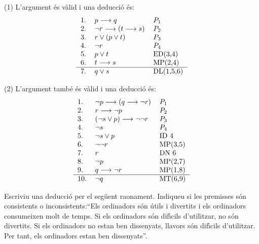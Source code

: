 \begin{solucio}
(1) L'argument \'{e}s v\`{a}lid i una deducci\'{o} \'{e}s:
\[%
\begin{tabular}
[c]{lll}%
1. & $p\longrightarrow q$ & $P_{1}$\\
2. & $\lnot r\longrightarrow\left(  t\longrightarrow s\right)  $ & $P_{2}$\\
3. & $r\vee\left(  p\vee t\right)  $ & $P_{3}$\\
4. & $\lnot r$ & $P_{4}$\\
5. & $p\vee t$ & ED(3,4)\\
6. & $t\longrightarrow s$ & MP(2,4)\\\hline
7. & $q\vee s$ & DL(1,5,6)
\end{tabular}
\]


(2) L'argument tamb\'{e} \'{e}s v\`{a}lid i una deducci\'{o} \'{e}s:%
\[%
\begin{tabular}
[c]{lll}%
1. & $\lnot p\longrightarrow\left(  q\longrightarrow\lnot r\right)  $ &
$P_{1}$\\
2. & $r\longrightarrow\lnot p$ & $P_{2}$\\
3. & $\left(  \lnot s\vee p\right)  \longrightarrow\lnot\lnot r$ & $P_{3}$\\
4. & $\lnot s$ & $P_{4}$\\
5. & $\lnot s\vee p$ & ID 4\\
6. & $\lnot\lnot r$ & MP(3,5)\\
7. & $r$ & DN 6\\
8. & $\lnot p$ & MP(2,7)\\
9. & $q\longrightarrow\lnot r$ & MP(1,8)\\\hline
10. & $\lnot q$ & MT(6,9)
\end{tabular}
\]

\end{solucio}

\begin{exercici}
Escriviu una deducci\'{o} per el seg\"{u}ent raonament. Indiqueu si les
premisses s\'{o}n consistents o inconsistents:\textquotedblleft Els ordinadors
s\'{o}n \'{u}tils i divertits i els ordinadors consumeixen molt de temps. Si
els ordinadors s\'{o}n dif\'{\i}cils d'utilitzar, no s\'{o}n divertits. Si els
ordinadors no estan ben dissenyats, llavors s\'{o}n dif\'{\i}cils d'utilitzar.
Per tant, els ordinadors estan ben dissenyats\textquotedblright.
\end{exercici}

